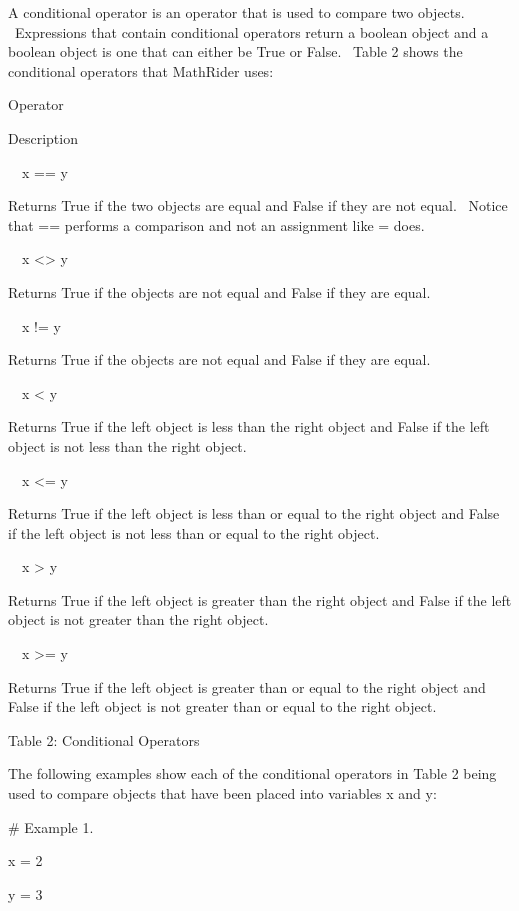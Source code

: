 \documentclass[12pt,twoside]{book}
\begin{document}
A conditional operator is an operator that is used to compare two objects. \ Expressions that contain conditional operators return a boolean object and a boolean object is one that can either be True or False. \ Table 2 shows the conditional operators that MathRider uses: 

\bigskip

Operator

Description

\ \ x == y

Returns True if the two objects are equal and False if they are not equal. \ Notice that == performs a comparison and not an assignment like = does.

\ \ x {\textless}{\textgreater} y

Returns True if the objects are not equal and False if they are equal.

\ \ x != y

Returns True if the objects are not equal and False if they are equal.

\ \ x {\textless} y

Returns True if the left object is less than the right object and False if the left object is not less than the right object.

\ \ x {\textless}= y

Returns True if the left object is less than or equal to the right object and False if the left object is not less than or equal to the right object.

\ \ x {\textgreater} y

Returns True if the left object is greater than the right object and False if the left object is not greater than the right object.

\ \ x {\textgreater}= y

Returns True if the left object is greater than or equal to the right object and False if the left object is not greater than or equal to the right object.

Table 2: Conditional Operators


\bigskip

The following examples show each of the conditional operators in Table 2 being used to compare objects that have been placed into variables x and y:


\bigskip

\# Example 1.

x = 2

y = 3 


\bigskip
\end{document}
